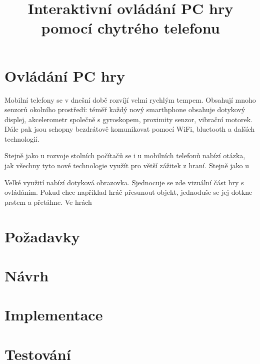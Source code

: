 \documentclass[thesis=B,czech]{FITthesis}[2012/06/26] %
\title{Interaktivn{\' i} ovl{\' a}d{\' a}n{\' i} PC hry pomoc{\' i} chytr{\' e}ho telefonu}
\begin{document}


\begin{introduction}


\end{introduction}

\chapter{Ovládání PC hry}



Mobilní telefony se v dnešní době rozvíjí velmi rychlým tempem. Obsahují mnoho senzorů okolního prostředí: téměř každý nový smarthphone obsahuje dotykový displej, akcelerometr společně s gyroskopem, proximity senzor, vibrační motorek. Dále pak jsou schopny bezdrátově komunikovat pomocí WiFi, bluetooth a dalších technologií.

Stejně jako u rozvoje stolních počítačů se i u mobilních telefonů nabízí otázka, jak všechny tyto nové technologie využít pro větší zážitek z hraní. Stejně jako u 

Velké využití nabízí dotyková obrazovka. Sjednocuje se zde vizuální část hry s ovládáním. Pokud chce například hráč přesunout objekt, jednoduše se jej dotkne prstem a přetáhne. Ve hrách 




\chapter{Požadavky}

\chapter{Návrh}

\chapter{Implementace}

\chapter{Testování}
\end{document}
